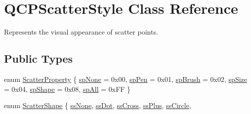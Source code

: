 \hypertarget{class_q_c_p_scatter_style}{}\section{Q\+C\+P\+Scatter\+Style Class Reference}
\label{class_q_c_p_scatter_style}


Represents the visual appearance of scatter points.  


\subsection*{Public Types}
\begin{DoxyCompactItemize}
\item 
enum \mbox{\hyperlink{class_q_c_p_scatter_style_a8974f6a20f8f6eea7781f0e6af9deb46}{Scatter\+Property}} \{ \newline
\mbox{\hyperlink{class_q_c_p_scatter_style_a8974f6a20f8f6eea7781f0e6af9deb46a5891be10bea382fad6c20f7737a2dd90}{sp\+None}} = 0x00, 
\mbox{\hyperlink{class_q_c_p_scatter_style_a8974f6a20f8f6eea7781f0e6af9deb46aa04d012e7c03e455db2b68fdd55c2a04}{sp\+Pen}} = 0x01, 
\mbox{\hyperlink{class_q_c_p_scatter_style_a8974f6a20f8f6eea7781f0e6af9deb46af0499b1fc04de2dcc7e47ff0ef75c904}{sp\+Brush}} = 0x02, 
\mbox{\hyperlink{class_q_c_p_scatter_style_a8974f6a20f8f6eea7781f0e6af9deb46a553ae95798ace9a328c7cd62045260b0}{sp\+Size}} = 0x04, 
\newline
\mbox{\hyperlink{class_q_c_p_scatter_style_a8974f6a20f8f6eea7781f0e6af9deb46a19c224563adb42c55fb8b7ae6904411b}{sp\+Shape}} = 0x08, 
\mbox{\hyperlink{class_q_c_p_scatter_style_a8974f6a20f8f6eea7781f0e6af9deb46af62509c0409467f387234274762e6f69}{sp\+All}} = 0x\+FF
 \}
\item 
enum \mbox{\hyperlink{class_q_c_p_scatter_style_adb31525af6b680e6f1b7472e43859349}{Scatter\+Shape}} \{ \newline
\mbox{\hyperlink{class_q_c_p_scatter_style_adb31525af6b680e6f1b7472e43859349abd144c291ca274f77053ec68cab6c022}{ss\+None}}, 
\mbox{\hyperlink{class_q_c_p_scatter_style_adb31525af6b680e6f1b7472e43859349a06e15a735b79093a1d999c0374fa3aa1}{ss\+Dot}}, 
\mbox{\hyperlink{class_q_c_p_scatter_style_adb31525af6b680e6f1b7472e43859349a9eacd60f059dc3ef71bf249f515a6fe4}{ss\+Cross}}, 
\mbox{\hyperlink{class_q_c_p_scatter_style_adb31525af6b680e6f1b7472e43859349a2d7f1d3c1a148b9d9d17f2fd9cae5eb7}{ss\+Plus}}, 
\newline
\mbox{\hyperlink{class_q_c_p_scatter_style_adb31525af6b680e6f1b7472e43859349a7c92a110880d0ef2170dff3a5b4f7779}{ss\+Circle}}, 

\end{DoxyCompactItemize}
